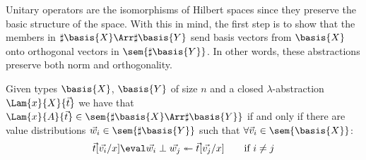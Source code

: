 Unitary operators are the isomorphisms of Hilbert spaces since they preserve the basic structure of the space. With this in mind, the first step is to show that the members in $\sharp\basis{X}\Arr\sharp{\basis{Y}}$ send basis vectors from $\basis{X}$ onto orthogonal vectors in $\sem{\sharp\basis{Y}}$. In other words, these abstractions preserve both norm and orthogonality.

\begin{lemma}\label{lem:BasesIso}
  Given types $\basis{X}$, $\basis{Y}$ of size $n$ and a closed $\lambda$-abstraction $\Lam{x}{X}{\vec t}$ we have that $\Lam{x}{A}{\vec t}\in\sem{\sharp\basis{X}\Arr\sharp\basis{Y}}$ if and only if there are value distributions $\vec w_i\in\sem{\sharp\basis{Y}}$ such that $\forall\vec v_i\in\sem{\basis{X}}$:
  \[
    \vec{t}[\vec{v_i}/x]\eval\vec{w_i}\perp\vec{w_j}\twoheadleftarrow \vec{t}[\vec{v_j}/x] \qquad \text{if } i\neq j
  \]
\end{lemma}

